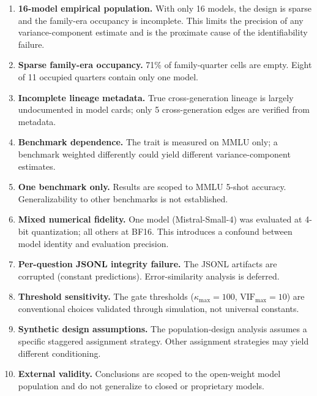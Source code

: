 \documentclass[journal]{IEEEtran}
\begin{document}
\begin{enumerate}[nosep]
\item \textbf{16-model empirical population.} With only 16 models, the design is sparse and the family-era occupancy is incomplete. This limits the precision of any variance-component estimate and is the proximate cause of the identifiability failure.

\item \textbf{Sparse family-era occupancy.} 71\% of family-quarter cells are empty. Eight of 11 occupied quarters contain only one model.

\item \textbf{Incomplete lineage metadata.} True cross-generation lineage is largely undocumented in model cards; only 5 cross-generation edges are verified from metadata.

\item \textbf{Benchmark dependence.} The trait is measured on MMLU only; a benchmark weighted differently could yield different variance-component estimates.

\item \textbf{One benchmark only.} Results are scoped to MMLU 5-shot accuracy. Generalizability to other benchmarks is not established.

\item \textbf{Mixed numerical fidelity.} One model (Mistral-Small-4) was evaluated at 4-bit quantization; all others at BF16. This introduces a confound between model identity and evaluation precision.

\item \textbf{Per-question JSONL integrity failure.} The JSONL artifacts are corrupted (constant predictions). Error-similarity analysis is deferred.

\item \textbf{Threshold sensitivity.} The gate thresholds ($\kappa_{\max} = 100$, $\text{VIF}_{\max} = 10$) are conventional choices validated through simulation, not universal constants.

\item \textbf{Synthetic design assumptions.} The population-design analysis assumes a specific staggered assignment strategy. Other assignment strategies may yield different conditioning.

\item \textbf{External validity.} Conclusions are scoped to the open-weight model population and do not generalize to closed or proprietary models.


\end{enumerate}
\end{document}
